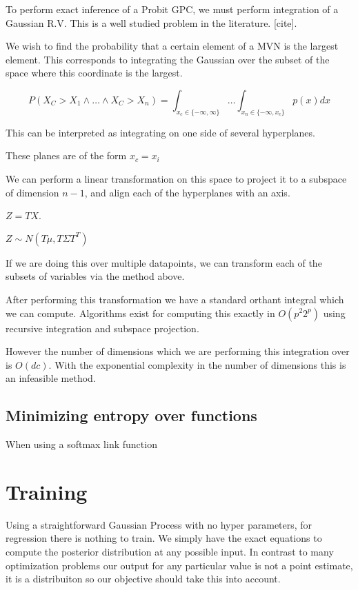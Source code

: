 \documentclass[12pt, a4paper]{report}
\theoremstyle{definition}
\begin{document}
To perform exact inference of a Probit GPC, we must perform integration of a Gaussian R.V. This is a well studied problem in the literature. [cite].


We wish to find the probability that a certain element of a MVN is the largest element. This corresponds to integrating the Gaussian over the subset of the space where this coordinate is the largest.

$$P(X_C > X_1 \land \ldots \land X_C > X_n) = \int_{x_c \in \{ -\infty, \infty \} } \ldots \int_{x_n \in \{ -\infty , x_c \}} p(x) dx$$

This can be interpreted as integrating on one side of several hyperplanes.

These planes are of the form $x_c = x_i$

We can perform a linear transformation on this space to project it to a subspace of dimension $n-1$, and align each of the hyperplanes with an axis.

$Z = TX$.

$Z \sim N(T \mu, T \Sigma T^T)$


If we are doing this over multiple datapoints, we can transform each of the subsets of variables via the method above.

After performing this transformation we have a standard orthant integral which we can compute. Algorithms exist for computing this exactly in $O(p^2 2^p)$ using recursive integration and subspace projection. \cite{orthant}


However the number of dimensions which we are performing this integration over is $O(dc)$. With the exponential complexity in the number of dimensions this is an infeasible method.



\subsection{Minimizing entropy over functions}

When using a softmax link function


\section{Training}

Using a straightforward Gaussian Process with no hyper parameters, for regression there is nothing to train. We simply have the exact equations to compute the posterior distribution at any possible input. In contrast to many optimization problems our output for any particular value is not a point estimate, it is a distribuiton so our objective should take this into account.
\end{document}
